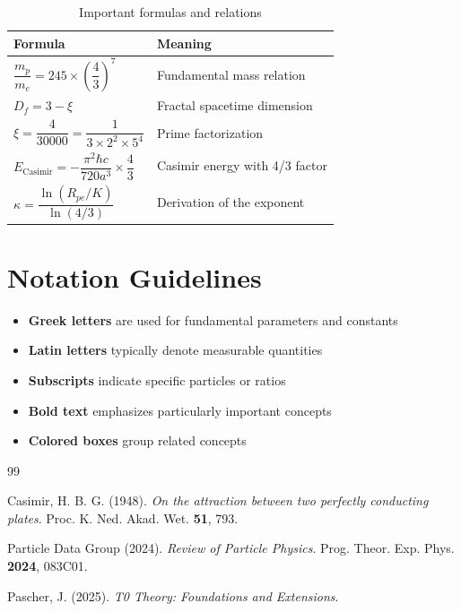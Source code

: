 	\begin{table}[htbp]
		\centering
		\begin{tabular}{p{4cm}p{8cm}}
			\toprule
			\textbf{Formula} & \textbf{Meaning} \\
			\midrule
			$\dfrac{m_p}{m_e} = 245 \times \left( \dfrac{4}{3} \right)^7$ & Fundamental mass relation \\
			$D_f = 3 - \xi$ & Fractal spacetime dimension \\
			$\xi = \dfrac{4}{30000} = \dfrac{1}{3 \times 2^2 \times 5^4}$ & Prime factorization \\
			$E_{\text{Casimir}} = -\dfrac{\pi^2 \hbar c}{720 a^3} \times \dfrac{4}{3}$ & Casimir energy with 4/3 factor \\
			$\kappa = \dfrac{\ln(R_{pe}/K)}{\ln(4/3)}$ & Derivation of the exponent \\
			\bottomrule
		\end{tabular}
		\caption{Important formulas and relations}
	\end{table}
	
	\section*{Notation Guidelines}
	
	\begin{itemize}
		\item \textbf{Greek letters} are used for fundamental parameters and constants
		\item \textbf{Latin letters} typically denote measurable quantities
		\item \textbf{Subscripts} indicate specific particles or ratios
		\item \textbf{Bold text} emphasizes particularly important concepts
		\item \textbf{Colored boxes} group related concepts
	\end{itemize}
	
	\begin{thebibliography}{99}
		
		Casimir, H. B. G. (1948). \textit{On the attraction between two perfectly conducting plates}.
		Proc. K. Ned. Akad. Wet. \textbf{51}, 793.
		
		Particle Data Group (2024). \textit{Review of Particle Physics}.
		Prog. Theor. Exp. Phys. \textbf{2024}, 083C01.
		
		Pascher, J. (2025). \textit{T0 Theory: Foundations and Extensions}.

	\end{thebibliography}
